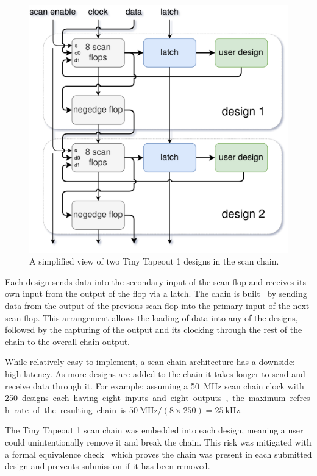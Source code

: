\begin{figure}[!t]
\centering
\includegraphics[width=\columnwidth]{./Figs/scanchain_block_diagram.png}
\caption{A simplified view of two Tiny Tapeout 1 designs in the scan chain.}
\label{fig:simplified_view_2_designs}
\end{figure}

Each design sends data into the secondary input of the scan flop and receives its own input from the output of the flop via a latch.
The chain is built~\cite{updateiodesign} by sending data from the output of the previous scan flop into the primary input of the next scan flop.
This arrangement allows the loading of data into any of the designs, followed by the capturing of the output and its clocking through the rest of the chain to the overall chain output.

While relatively easy to implement, a scan chain architecture has a downside: high latency.
As more designs are added to the chain it takes longer to send and receive data through it.
For example: assuming a \qty{50}{\MHz} scan chain clock with \qty{250} designs each having eight inputs and eight outputs, the maximum refresh rate of the resulting chain is $\qty{50}{\MHz} / (8 \times 250) = \qty{25}{\kHz}$.

The Tiny Tapeout 1 scan chain was embedded into each design, meaning a user could unintentionally remove it and break the chain.
This risk was mitigated with a formal equivalence check~\cite{tinytapeoutscan} which proves the chain was present in each submitted design and prevents submission if it has been removed.

